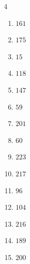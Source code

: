 \begin{multicols}{4}
\begin{enumerate}

  \item $161$


  \item $175$


  \item $15$


  \item $118$


  \item $147$


  \item $59$


  \item $201$


\columnbreak %

\resetques

  \item $60$


  \item $223$


  \item $217$


  \item $96$


  \item $104$


  \item $216$


  \item $189$


  \item $200$


\end{enumerate}
\end{multicols}
